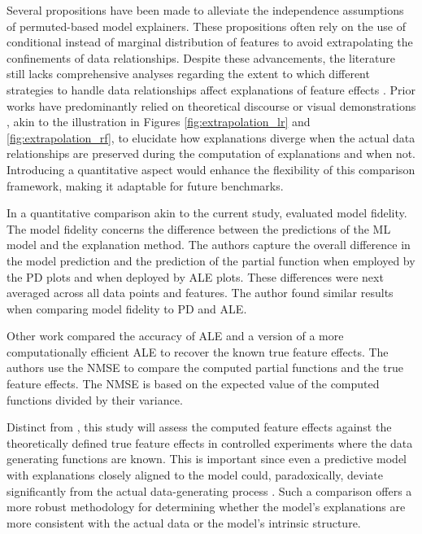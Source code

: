 Several propositions have been made to alleviate the independence assumptions of permuted-based model explainers. These propositions often rely on the use of conditional instead of marginal distribution of features to avoid extrapolating the confinements of data relationships. Despite these advancements, the literature still lacks comprehensive analyses regarding the extent to which different strategies to handle data relationships affect explanations of feature effects \cite{Molnar2022GeneralModels}. Prior works have predominantly relied on theoretical discourse or visual demonstrations \cite{Apley2020VisualizingModels, Gkolemis2022DALE:Explanations, Gkolemis2023RHALE:Effects, Mangalathu2022Machine-learningSystems, Bakhshi2021UtilizingModels}, akin to the illustration in Figures \ref{fig:extrapolation_lr} and \ref{fig:extrapolation_rf}, to elucidate how explanations diverge when the actual data relationships are preserved during the computation of explanations and when not. Introducing a quantitative aspect would enhance the flexibility of this comparison framework, making it adaptable for future benchmarks. 

In a quantitative comparison akin to the current study, \cite{Molnar2023Model-agnosticApproach} evaluated model fidelity. The model fidelity concerns the difference between the predictions of the \gls{ML} model and the explanation method. The authors capture the overall difference in the model prediction and the prediction of the partial function when employed by the \gls{PD} plots and when deployed by \gls{ALE} plots. These differences were next averaged across all data points and features. The author found similar results when comparing model fidelity to \gls{PD} and \gls{ALE}.

Other work \cite{Gkolemis2022DALE:Explanations} compared the accuracy of \gls{ALE} and a version of a more computationally efficient ALE to recover the known true feature effects. The authors use the \gls{NMSE} to compare the computed partial functions and the true feature effects. The \gls{NMSE} is based on the expected value of the computed functions divided by their variance. 

Distinct from \cite{Molnar2023Model-agnosticApproach}, this study will assess the computed feature effects against the theoretically defined true feature effects in controlled experiments where the data generating functions are known. This is important since even a predictive model with explanations closely aligned to the model could, paradoxically, deviate significantly from the actual data-generating process \cite{Fisher2018AllSimultaneously, Slack2020FoolingSHAP}.  Such a comparison offers a more robust methodology for determining whether the model's explanations are more consistent with the actual data or the model's intrinsic structure. 

